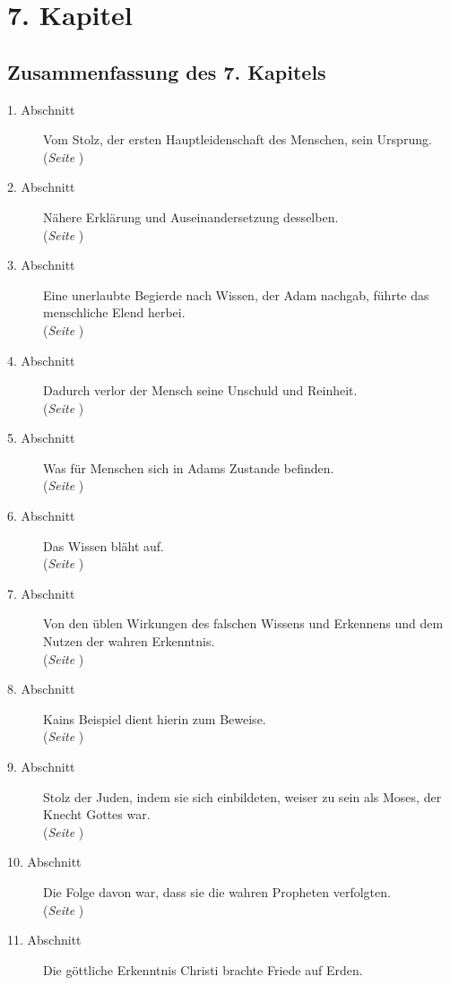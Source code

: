 

\chapter{7. Kapitel} \label{kap7}

\section{Zusammenfassung des 7. Kapitels}
\footnotesize
\begin{description}
\item[1. Abschnitt] Vom Stolz, der ersten Hauptleidenschaft des Menschen, sein
Ursprung.
\\(\textit{Seite \pageref{kap7_ab1}})
\item[2. Abschnitt]  Nähere Erklärung und Auseinandersetzung desselben.
\\(\textit{Seite \pageref{kap7_ab2}})
\item[3. Abschnitt] Eine unerlaubte Begierde nach Wissen, der Adam nachgab,
führte das menschliche Elend herbei.
\\(\textit{Seite \pageref{kap7_ab3}})
\item[4. Abschnitt] Dadurch verlor der Mensch seine Unschuld und Reinheit.
\\(\textit{Seite \pageref{kap7_ab4}})
\item[5. Abschnitt] Was für Menschen sich in Adams Zustande befinden.
\\(\textit{Seite \pageref{kap7_ab5}})
\item[6. Abschnitt] Das Wissen bläht auf.
\\(\textit{Seite \pageref{kap7_ab6}})
\item[7. Abschnitt] Von den üblen Wirkungen des falschen Wissens und Erkennens
und dem Nutzen der wahren Erkenntnis.
\\(\textit{Seite \pageref{kap7_ab7}})
\item[8. Abschnitt] Kains Beispiel dient hierin zum Beweise.
\\(\textit{Seite \pageref{kap7_ab8}})
\item[9. Abschnitt] Stolz der Juden, indem sie sich einbildeten, weiser zu sein
als
Moses, der Knecht Gottes war.
\\(\textit{Seite \pageref{kap7_ab9}})
\item[10. Abschnitt] Die Folge davon war, dass sie die wahren Propheten
verfolgten.
\\(\textit{Seite \pageref{kap7_ab10}})
\item[11. Abschnitt] Die göttliche Erkenntnis Christi brachte Friede auf Erden.

\end{description}
